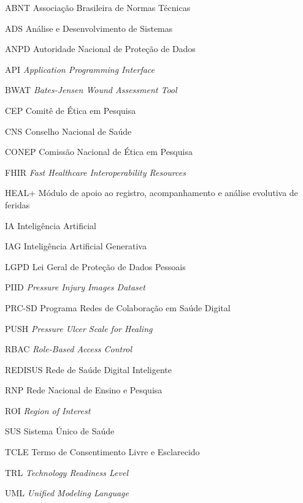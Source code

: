 \documentclass[
    12pt,
    oneside,
    a4paper,
    chapter=TITLE,
    brazil,
    sumario=tradicional,
    hidelinks
]{abntex2}
\begin{document}
\begin{siglas}
    \item[ABNT] Associação Brasileira de Normas Técnicas
    \item[ADS] Análise e Desenvolvimento de Sistemas
    \item[ANPD] Autoridade Nacional de Proteção de Dados
    \item[API] \textit{Application Programming Interface}
    \item[BWAT] \textit{Bates-Jensen Wound Assessment Tool}
    \item[CEP] Comitê de Ética em Pesquisa
    \item[CNS] Conselho Nacional de Saúde
    \item[CONEP] Comissão Nacional de Ética em Pesquisa
    \item[FHIR] \textit{Fast Healthcare Interoperability Resources}
    \item[HEAL+] Módulo de apoio ao registro, acompanhamento e análise evolutiva de feridas
    \item[IA] Inteligência Artificial
    \item[IAG] Inteligência Artificial Generativa
    \item[LGPD] Lei Geral de Proteção de Dados Pessoais
    \item[PIID] \textit{Pressure Injury Images Dataset}
    \item[PRC-SD] Programa Redes de Colaboração em Saúde Digital
    \item[PUSH] \textit{Pressure Ulcer Scale for Healing}
    \item[RBAC] \textit{Role-Based Access Control}
    \item[REDISUS] Rede de Saúde Digital Inteligente
    \item[RNP] Rede Nacional de Ensino e Pesquisa
    \item[ROI] \textit{Region of Interest}
    \item[SUS] Sistema Único de Saúde
    \item[TCLE] Termo de Consentimento Livre e Esclarecido
    \item[TRL] \textit{Technology Readiness Level}
    \item[UML] \textit{Unified Modeling Language}
\end{siglas}

\listoffigures*
\cleardoublepage

\listoftables*
\cleardoublepage
\end{document}
